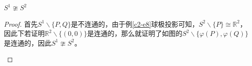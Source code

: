 \documentclass[lang=cn,10pt,device=pad]{elegantbook}
\newcommand{\dkh}[1]{\{#1\}}
\newcommand{\chadiao}{\backslash}
\begin{document}
\begin{example}[一维球面与二维球面不同胚]
	$S^{1}\ncong S^{2}$
\end{example}
\begin{proof}首先$S^{1}\chadiao\dkh{P,Q}$是不连通的，由于例\ref{c2-e8}球极投影可知，$S^{2}\chadiao\dkh{P}\cong \mathbb{R}^{2}$，因此下若证明$\mathbb{R}^{2}\chadiao\dkh{(0,0)}$是连通的，那么就证明了如图的$S^{2}\chadiao\dkh{\varphi(P),\varphi(Q)}$是连通的，因此$S^{1}\ncong S^{2}$。
	\begin{figure}[h]
		\centering
		


\begin{tikzpicture}[x=0.75pt,y=0.75pt,yscale=-1,xscale=1]


\end{tikzpicture}
\end{figure}
\end{proof}
\end{document}
